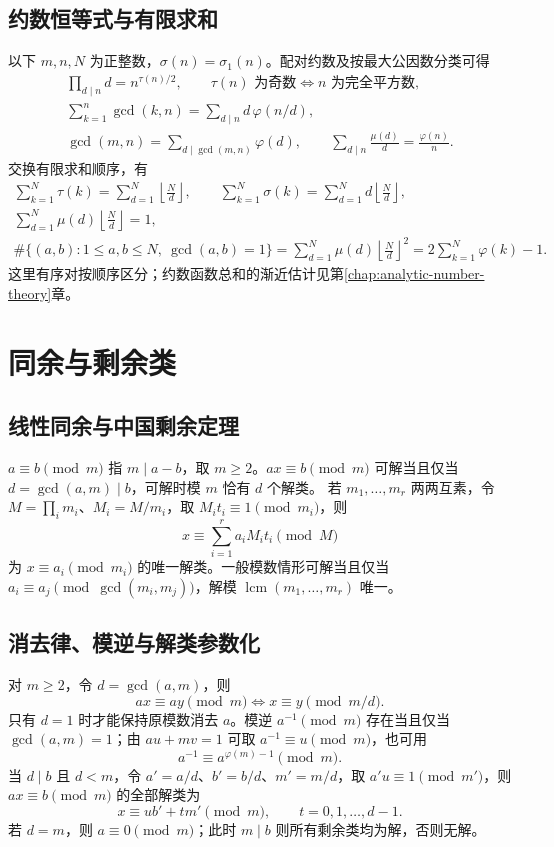 \documentclass[../main.tex]{subfiles}
\begin{document}
\subsection{约数恒等式与有限求和}
以下 $m,n,N$ 为正整数，$\sigma(n)=\sigma_1(n)$。配对约数及按最大公因数分类可得
\begin{gather*}
\prod_{d\mid n}d=n^{\tau(n)/2},\qquad
\tau(n)\text{ 为奇数}\iff n\text{ 为完全平方数},\\
\sum_{k=1}^n\gcd(k,n)=\sum_{d\mid n}d\,\varphi(n/d),\\
\gcd(m,n)=\sum_{d\mid\gcd(m,n)}\varphi(d),\qquad
\sum_{d\mid n}\frac{\mu(d)}d=\frac{\varphi(n)}n.
\end{gather*}
交换有限求和顺序，有
\begin{gather*}
\sum_{k=1}^N\tau(k)=\sum_{d=1}^N\left\lfloor\frac Nd\right\rfloor,\qquad
\sum_{k=1}^N\sigma(k)=\sum_{d=1}^N d\left\lfloor\frac Nd\right\rfloor,\\
\sum_{d=1}^N\mu(d)\left\lfloor\frac Nd\right\rfloor=1,\\
\#\{(a,b):1\le a,b\le N,\ \gcd(a,b)=1\}
=\sum_{d=1}^N\mu(d)\left\lfloor\frac Nd\right\rfloor^2
=2\sum_{k=1}^N\varphi(k)-1.
\end{gather*}
这里有序对按顺序区分；约数函数总和的渐近估计见第\ref{chap:analytic-number-theory}章。

\section{同余与剩余类}
\subsection{线性同余与中国剩余定理}
$a\equiv b\pmod m$ 指 $m\mid a-b$，取 $m\ge2$。$ax\equiv b\pmod m$ 可解当且仅当 $d=\gcd(a,m)\mid b$，可解时模 $m$ 恰有 $d$ 个解类。
若 $m_1,\ldots,m_r$ 两两互素，令 $M=\prod_im_i$、$M_i=M/m_i$，取 $M_it_i\equiv1\pmod{m_i}$，则
\[
x\equiv\sum_{i=1}^ra_iM_it_i\pmod M
\]
为 $x\equiv a_i\pmod{m_i}$ 的唯一解类。一般模数情形可解当且仅当 $a_i\equiv a_j\pmod{\gcd(m_i,m_j)}$，解模 $\operatorname{lcm}(m_1,\ldots,m_r)$ 唯一。
\subsection{消去律、模逆与解类参数化}
对 $m\ge2$，令 $d=\gcd(a,m)$，则
\[
ax\equiv ay\pmod m\iff x\equiv y\pmod{m/d}.
\]
只有 $d=1$ 时才能保持原模数消去 $a$。模逆 $a^{-1}\pmod m$ 存在当且仅当 $\gcd(a,m)=1$；由 $au+mv=1$ 可取 $a^{-1}\equiv u\pmod m$，也可用
\[
a^{-1}\equiv a^{\varphi(m)-1}\pmod m.
\]
当 $d\mid b$ 且 $d<m$，令 $a'=a/d$、$b'=b/d$、$m'=m/d$，取 $a'u\equiv1\pmod{m'}$，则 $ax\equiv b\pmod m$ 的全部解类为
\[
x\equiv ub'+tm'\pmod m,\qquad t=0,1,\ldots,d-1.
\]
若 $d=m$，则 $a\equiv0\pmod m$；此时 $m\mid b$ 则所有剩余类均为解，否则无解。
\end{document}

